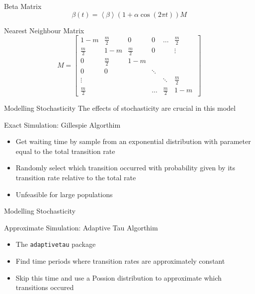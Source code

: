 \documentclass{beamer}\usepackage[]{graphicx}\usepackage[]{color}
\begin{document}
  \begin{frame}{Beta Matrix}
    \begin{equation*}
      \beta(t) = \left < \beta \right > (1+\alpha \cos(2\pi t))M
    \end{equation*}
    \begin{alertblock}{Nearest Neighbour Matrix}
      \[
      M =
      \begin{bmatrix}
      1-m & \frac{m}{2} & 0 & 0 & \dots & \frac{m}{2} \\
      \frac{m}{2} & 1-m & \frac{m}{2} & 0 & & \vdots \\
      0 & \frac{m}{2} & 1-m &  \\
      0 & 0 & & \ddots \\
      \vdots & & & & \ddots & \frac{m}{2} \\
      \frac{m}{2} &  & & \dots & \frac{m}{2} & 1-m \ 
      \end{bmatrix}
      \]
    \end{alertblock}
  \end{frame}
  
  \begin{frame}{Modelling Stochasticity}
  The effects of stochasticity are crucial in this model
  \pause 
      \begin{alertblock}{Exact Simulation: Gillespie Algorthim}
      \begin{itemize}
        \item Get waiting time by sample from an exponential distribution with parameter equal to the total transition rate
        \item Randomly select which transition occurred with probability given by its transition rate relative to the total rate
        \item Unfeasible for large populations
        \end{itemize}
      \end{alertblock}
  \end{frame}
  
  \begin{frame}{Modelling Stochasticity}
      \begin{alertblock}{Approximate Simulation: Adaptive Tau Algorthim}
      \begin{itemize}
      \item The \texttt{adaptivetau} package
        \item Find time periods where transition rates are approximately constant
        \item Skip this time and use a Possion distribution to approximate which transitions occured 
        \end{itemize}
      \end{alertblock}
  \end{frame}
  
\end{document}
